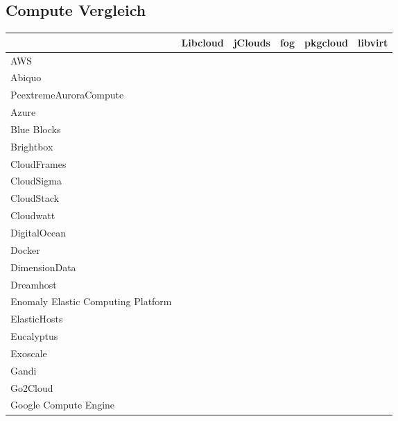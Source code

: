 
\subsection{Compute Vergleich}
\label{Compute Vergleich}
\begin{longtabu} to \textwidth {
    | X[10,r] |
     X[2.2,c] |
     X[2,c] |
     X[0.8,c] |
     X[2.2,c] |
     X[1.5,c] |
    }
\hline
 & Libcloud & jClouds & fog & pkgcloud & libvirt \\ \hline
AWS &   &   &   &   &  \\ \hline
Abiquo &  &  &  &  &  \\ \hline
PcextremeAuroraCompute &  &  &  &  &  \\ \hline
Azure &  &  &  &  &  \\ \hline
Blue Blocks &  &  &  &  &  \\ \hline
Brightbox &  &  &  &  &  \\ \hline
CloudFrames &  &  &  &  &  \\ \hline
CloudSigma &  &   &  &  &  \\ \hline
CloudStack &  &  &  &  &  \\ \hline
Cloudwatt &  &  &  &  &  \\ \hline
DigitalOcean &  &  &  &  &  \\ \hline
Docker &  &  &  &  &  \\ \hline
DimensionData &  &  &  &  &  \\ \hline
Dreamhost &  &  &  &  &  \\ \hline
Enomaly Elastic Computing Platform &  &  &  &  &  \\ \hline
ElasticHosts &  &  &  &  &  \\ \hline
Eucalyptus &  &  &  &  &  \\ \hline
Exoscale &  &  &  &  &  \\ \hline
Gandi &  &  &  &  &  \\ \hline
Go2Cloud &  &  &  &  &  \\ \hline
Google Compute Engine &  &  &  &  &  \\ \hline

\end{longtabu}
